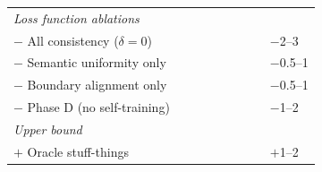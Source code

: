 \documentclass[10pt,twocolumn,letterpaper]{article}
\begin{document}
\begin{table}[t]
\begin{tabular}{lcccccccl}
\midrule
\multicolumn{9}{l}{\emph{Loss function ablations}} \\
$-$ All consistency ($\delta{=}0$) & \underline{\hspace{1.5em}} & \underline{\hspace{1.5em}} & \underline{\hspace{1.5em}} & \underline{\hspace{1.5em}} & \underline{\hspace{1.5em}} & \underline{\hspace{1.5em}} & \underline{\hspace{1.5em}} & $-$2--3 \\
$-$ Semantic uniformity only & \underline{\hspace{1.5em}} & \underline{\hspace{1.5em}} & \underline{\hspace{1.5em}} & \underline{\hspace{1.5em}} & \underline{\hspace{1.5em}} & \underline{\hspace{1.5em}} & \underline{\hspace{1.5em}} & $-$0.5--1 \\
$-$ Boundary alignment only & \underline{\hspace{1.5em}} & \underline{\hspace{1.5em}} & \underline{\hspace{1.5em}} & \underline{\hspace{1.5em}} & \underline{\hspace{1.5em}} & \underline{\hspace{1.5em}} & \underline{\hspace{1.5em}} & $-$0.5--1 \\
$-$ Phase D (no self-training) & \underline{\hspace{1.5em}} & \underline{\hspace{1.5em}} & \underline{\hspace{1.5em}} & \underline{\hspace{1.5em}} & \underline{\hspace{1.5em}} & \underline{\hspace{1.5em}} & \underline{\hspace{1.5em}} & $-$1--2 \\
\midrule
\multicolumn{9}{l}{\emph{Upper bound}} \\
$+$ Oracle stuff-things & \underline{\hspace{1.5em}} & \underline{\hspace{1.5em}} & \underline{\hspace{1.5em}} & \underline{\hspace{1.5em}} & \underline{\hspace{1.5em}} & \underline{\hspace{1.5em}} & \underline{\hspace{1.5em}} & $+$1--2 \\
\bottomrule
\end{tabular}
\end{table}
\end{document}
